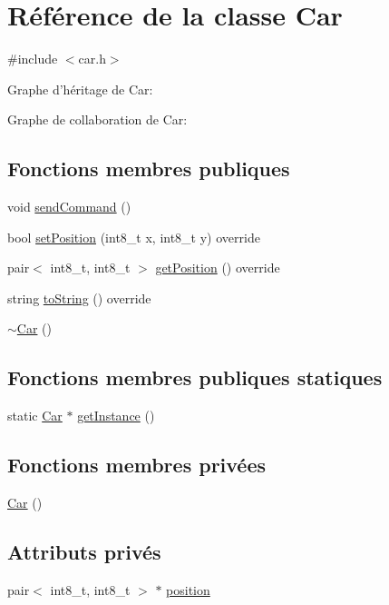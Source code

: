 \hypertarget{class_car}{\section{Référence de la classe Car}
\label{class_car}
}


{\ttfamily \#include $<$car.\-h$>$}



Graphe d'héritage de Car\-:


Graphe de collaboration de Car\-:
\subsection*{Fonctions membres publiques}
\begin{DoxyCompactItemize}
\item 
void \hyperlink{class_car_a2d3353932e4028eef864813b8c65583b}{send\-Command} ()
\item 
bool \hyperlink{class_car_a97e3c5de8eb65659ef520de6591f814d}{set\-Position} (int8\-\_\-t x, int8\-\_\-t y) override
\item 
pair$<$ int8\-\_\-t, int8\-\_\-t $>$ \hyperlink{class_car_a20dd521474ee36b144bde58e3359eed6}{get\-Position} () override
\item 
string \hyperlink{class_car_afb39c5a80ff1977ee13cb1e5cdf2fecd}{to\-String} () override
\item 
\hyperlink{class_car_a5933bb06e96b159fe339a128abda888a}{$\sim$\-Car} ()
\end{DoxyCompactItemize}
\subsection*{Fonctions membres publiques statiques}
\begin{DoxyCompactItemize}
\item 
static \hyperlink{class_car}{Car} $\ast$ \hyperlink{class_car_a40cbec40dad9ddda76c277da17f23528}{get\-Instance} ()
\end{DoxyCompactItemize}
\subsection*{Fonctions membres privées}
\begin{DoxyCompactItemize}
\item 
\hyperlink{class_car_a1c803f7c5038d3e31b368b0d0a35493c}{Car} ()
\end{DoxyCompactItemize}
\subsection*{Attributs privés}
\begin{DoxyCompactItemize}
\item 
pair$<$ int8\-\_\-t, int8\-\_\-t $>$ $\ast$ \hyperlink{class_car_a43e9c00e78af10fc998624a811e014df}{position}
\end{DoxyCompactItemize}
